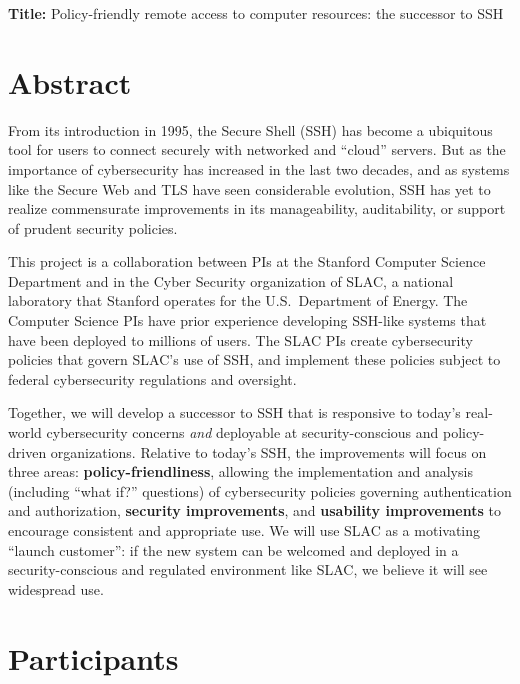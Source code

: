 \documentclass[10pt]{article}
\begin{document}
\noindent \textbf{Title:} Policy-friendly remote access to computer resources: the successor to SSH

\vspace{-.5\baselineskip}

\section*{Abstract}

From its introduction in 1995, the Secure Shell (SSH) has become a
ubiquitous tool for users to connect securely with networked and
``cloud'' servers. But as the importance of cybersecurity has
increased in the last two decades, and as systems like the Secure Web
and TLS have seen considerable evolution, SSH has yet to realize
commensurate improvements in its manageability, auditability, or
support of prudent security policies.

This project is a collaboration between PIs at the Stanford Computer
Science Department and in the Cyber Security organization of SLAC, a
national laboratory that Stanford operates for the U.S.~Department of
Energy. The Computer Science PIs have prior experience developing
SSH-like systems that have been deployed to millions of users. The
SLAC PIs create cybersecurity policies that govern SLAC's use of SSH,
and implement these policies subject to federal cybersecurity regulations and oversight.

Together, we will develop a successor to SSH that is responsive to
today's real-world cybersecurity concerns \emph{and} deployable at
security-conscious and policy-driven organizations. Relative to
today's SSH, the improvements will focus on three areas:
\textbf{policy-friendliness}, allowing the implementation and analysis
(including ``what if?'' questions) of cybersecurity policies governing
authentication and authorization, \textbf{security improvements}, and
\textbf{usability improvements} to encourage consistent and
appropriate use. We will use SLAC as a motivating ``launch customer'':
if the new system can be welcomed and deployed in a security-conscious
and regulated environment like SLAC, we believe it will see widespread
use.

\vspace{-.5\baselineskip}

\section{Participants}
\end{document}
